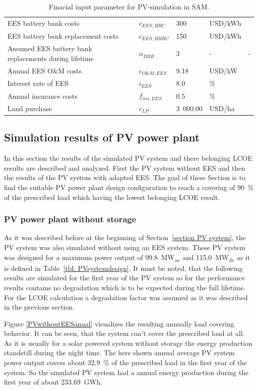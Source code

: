 \begin{table}[!h]
\begin{tabular}{  p{5.4cm} C{1.5cm} C{1.5cm}  C{1.7cm}  C{4.0cm} }
EES battery bank costs & $c_{EES,BBC}$ &300 & USD/kWh & \cite{Nykvist2015} \\ 
EES battery bank replacement costs & $c_{EES,BBRC}$ & 150 & USD/kWh & \cite{Zakeri2015} \\ 
Assumed EES battery bank replacements during lifetime & $n_{BBR}$ & 3 & - & - \\ 
Annual EES O\&M costs & $c_{O\&M,EES}$ & 9.18 & USD/kW & \cite{Zakeri2015}\\
Interest rate of EES & $i_{EES}$& 8.0 & \% & \cite{Zakeri2015} \\
Annual insurance costs& $f_{ins,EES}$ & 0.5 & \% & \cite{Cutter2014}\\ \hline
Land purchase &$c_{LP}$ & 3~000.00 & USD/ha & \cite{Cassell2012} \\ 
\hline
\end{tabular}
\caption[Finacial input parameter for PV-simulation in SAM.]{Finacial input parameter for PV-simulation in SAM.}\label{tbl: PVFinance}
\end{table}
\pagebreak
\subsection{Simulation results of PV power plant}
In this section the results of the simulated PV system and there belonging LCOE results are described and analyzed. First the PV system without EES and then the results of the PV system with adapted EES. The goal of these Section is to find the suitable PV power plant design configuration to reach a covering of 90~\% of the prescribed load which having the lowest belonging LCOE result.
\subsubsection{PV power plant without storage}
As it was described before at the beginning of Section~\ref{section PV system}, the PV system was also simulated without using an EES system. These PV system was designed for a maximum power output of \SI{99.8}{MW}\textsubscript{ac} and \SI{115.0}{MW}\textsubscript{dc} as it is defined in Table~\ref{tbl: PVsystemdesign}. It must be noted, that the following results are simulated for the first year of the PV system so for the performance results contains no degradation which is to be expected during the full lifetime. For the LCOE calculation a degradation factor was assumed as it was described in the previous section. 

Figure \ref{PVwithoutEESanual} visualizes the resulting annually load covering behavior. It can be seen, that the system can't cover the prescribed load at all. As it is usually for a solar powered system without storage the energy production standstill during the night time. The here shown annual average PV system power output covers about 32.9~\% of the prescribed load in the first year of the system. So the simulated PV system had a annual energy production during the first year of about \SI{233.69}{GWh}.

